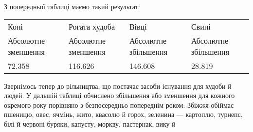 
З попередньої таблиці маємо такий результат:
\begin{center}
  \noindent\begin{tabularx}{\textwidth}{Y Y Y Y}
      Коні & Рогата худоба & Вівці & Свині \\
      Абсолютне зменшення & Абсолютне зменшення & Абсолютне збільшення & Абсолютне збільшення \\
      \num{72.358} & \num{116.626} & \num{146.608} & \num{28.819}\\

  \end{tabularx}
\end{center}

Звернімось тепер до рільництва, що постачає засоби існування
для худоби й людей. У дальшій таблиці обчислено збільшення
або зменшення для кожного окремого року порівняно з безпосередньо
попереднім роком. Збіжжя обіймає пшеницю, овес,
ячмінь, жито, квасолю й горох, зеленина — картоплю, турнепс,
білі й червоні буряки, капусту, моркву, пастернак, вику й~

\setlength{\tabcolsep}{2pt}

